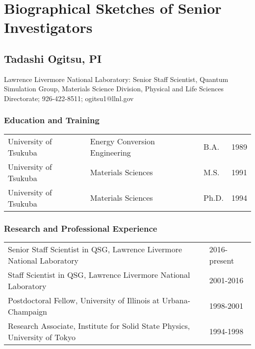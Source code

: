 
\section{Biographical Sketches of Senior Investigators}
\label{sec:bio}
\subsection*{Tadashi Ogitsu, PI}

Lawrence Livermore National Laboratory: Senior Staff Scientist, Quantum Simulation Group, Materials Science Division, Physical and Life Sciences Directorate; 926-422-8511; ogitsu1@llnl.gov

\subsubsection*{Education and Training}

\begin{table}[ht]
\centering
\begin{tabular}{llll} 
University of Tsukuba  & Energy Conversion Engineering & B.A. & 1989 \\ 
University of Tsukuba & Materials Sciences & M.S. & 1991 \\
University of Tsukuba & Materials Sciences & Ph.D. & 1994 \\
\end{tabular}
\end{table}

\subsubsection*{Research and Professional Experience}

\begin{table}[ht]
\centering
\begin{tabular}{ll} 
Senior Staff Scientist in QSG, Lawrence Livermore National Laboratory & 2016-present\\
Staff Scientist in QSG, Lawrence Livermore National Laboratory & 2001-2016 \\
Postdoctoral Fellow, University of Illinois at Urbana-Champaign & 1998-2001 \\
Research Associate, Institute for Solid State Physics, University of Tokyo & 1994-1998 \\
\end{tabular}
\end{table}

